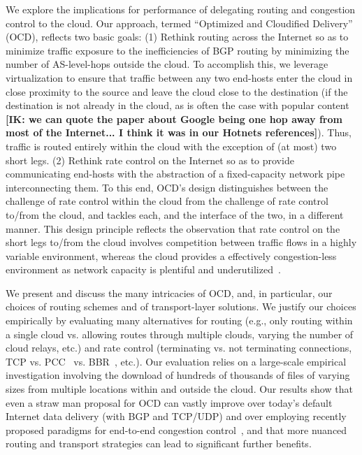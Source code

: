\documentclass[sigconf,usenames,dvipsnames,geometry]{acmart}
\newcommand{\mycomm}[3]{{\color{#2} \textbf{[#1: #3]}}}
\newcommand{\mycomm}[3]{}
\newcommand{\IK}[1]{\mycomm{IK}{blue}{#1}}
\begin{document}
We explore the implications for performance of delegating routing and congestion control to the cloud. Our approach, termed ``Optimized and Cloudified Delivery'' (OCD), reflects two basic goals: (1) Rethink routing across the Internet so as to minimize traffic exposure to the inefficiencies of BGP routing by minimizing the number of AS-level-hops outside the cloud. To accomplish this, we leverage virtualization to ensure that traffic between any two end-hosts enter the cloud in close proximity to the source and leave the cloud close to the destination (if the destination is not already in the cloud, as is often the case with popular content\IK{we can quote the paper about Google being one hop away from most of the Internet... I think it was in our Hotnets references}). Thus, traffic is routed entirely within the cloud with the exception of (at most) two short legs. (2) Rethink rate control on the Internet so as to provide communicating end-hosts with the abstraction of a fixed-capacity network pipe interconnecting them. To this end, OCD's design distinguishes between the challenge of rate control within the cloud from the challenge of rate control to/from the cloud, and tackles each, and the interface of the two, in a different manner. This design principle reflects the observation that rate control on the short legs to/from the cloud involves competition between traffic flows in a highly variable environment, whereas the cloud provides a effectively congestion-less environment as network capacity is plentiful and underutilized~\cite{x,y}.

We present and discuss the many intricacies of OCD, and, in particular, our choices of routing schemes and of transport-layer solutions. We justify our choices empirically by evaluating many alternatives for routing (e.g., only routing within a single cloud vs. allowing routes through multiple clouds, varying the number of cloud relays, etc.) and rate control (terminating vs. not terminating connections, TCP vs. PCC~\cite{PCC} vs. BBR~\cite{BBR}, etc.). Our evaluation relies on a large-scale empirical investigation involving the download of hundreds of thousands of files of varying sizes from multiple locations within and outside the cloud. Our results show that even a straw man proposal for OCD can vastly improve over today's default Internet data delivery (with BGP and TCP/UDP) and over employing recently proposed paradigms for end-to-end congestion control~\cite{x,y}, and that more nuanced routing and transport strategies can lead to significant further benefits.
\end{document}
